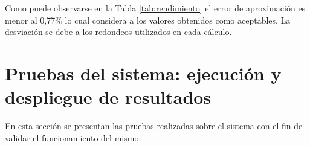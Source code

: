 \par Como puede observarse en la Tabla \ref{tab:rendimiento} el error de aproximación es menor al 0,77\% lo cual considera a los valores obtenidos como aceptables. La desviación se debe a los redondeos utilizados en cada cálculo. 



\section{Pruebas del sistema: ejecución y despliegue de resultados}

\par En esta sección se presentan las pruebas realizadas sobre el sistema con el fin de validar el funcionamiento del mismo. 

